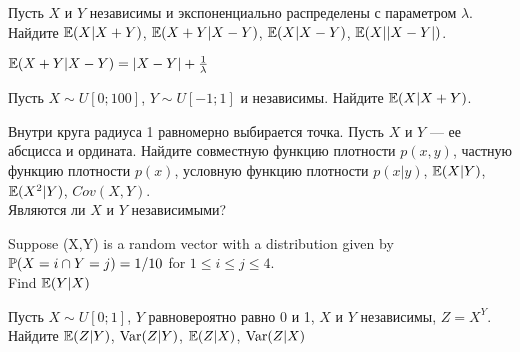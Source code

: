 \begin{solution}
\begin{solution}
\begin{solution}
\begin{solution}
\begin{solution}
\begin{solution}
\begin{solution}
\begin{problem}
Пусть $X$ и $Y$ независимы и экспоненциально распределены с параметром $\lambda$. \\
Найдите $\E(X|X+Y)$, $\E(X+Y|X-Y)$, $\E(X|X-Y)$, $\E(X||X-Y|)$. 
\end{problem} 
\begin{solution} 

 $\E(X+Y|X-Y)=|X-Y|+\frac{1}{\lambda}$ 
\end{solution}

\begin{problem}
Пусть $X\sim U[0;100]$, $Y\sim U[-1;1]$ и независимы. Найдите $\E(X|X+Y)$. 
\end{problem} 
\begin{solution} 

\end{solution}

\begin{problem}
Внутри круга радиуса 1 равномерно выбирается точка. Пусть $X$ и $Y$ --- ее абсцисса и ордината. Найдите совместную функцию плотности $p(x,y)$, частную функцию плотности $p(x)$, условную функцию плотности $p(x|y)$, $\E(X|Y)$, $\E(X^{2}|Y)$, $Cov(X,Y)$. \\
Являются ли $X$ и $Y$ независимыми? 
\end{problem} 
\begin{solution} 

\end{solution}

\begin{problem}
Suppose (X,Y) is a random vector with a distribution given by $\P(X=i \cap Y=j)=1/10$  for $1\le i\le j\le 4$. \\
Find $\E(Y|X)$ 
\end{problem} 
\begin{solution} 

\end{solution}

\begin{problem}
Пусть $X\sim U[0;1]$, $Y$ равновероятно равно 0 и 1, $X$ и $Y$ независимы, $Z=X^{Y}$.
Найдите $\E(Z|Y)$, $\Var(Z|Y)$, $\E(Z|X)$, $\Var(Z|X)$ 
\end{problem} 
\begin{solution} 

\end{solution}


\end{solution}
\end{solution}
\end{solution}
\end{solution}
\end{solution}
\end{solution}
\end{solution}
